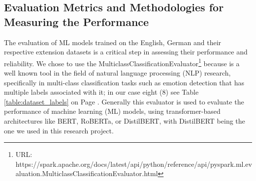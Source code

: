 \documentclass[11pt]{article}
\begin{document}
\subsection{Evaluation Metrics and Methodologies for Measuring the Performance}
\label{sec:evaluation-metrics-and-methodologies}
The evaluation of ML models trained on the English, German and their respective extension datasets is a critical step in assessing their performance and reliability. We chose to use the MulticlassClassificationEvaluator\footnote{URL: https://spark.apache.org/docs/latest/api/python/reference/api/pyspark.ml.evaluation.MulticlassClassificationEvaluator.html} because is a well known tool in the field of natural language processing (NLP) research, specifically in multi-class classification tasks such as emotion detection that has multiple labels associated with it; in our case eight (8) see Table \ref{table:dataset_labels} on Page \pageref{table:dataset_labels}. Generally this evaluator is used to evaluate the performance of machine learning (ML) models, using transformer-based architectures like BERT, RoBERTa, or DistilBERT\cite{Sanh2019-DistilBERT-AD}, with DistilBERT\cite{Sanh2019-DistilBERT-AD} being the one we used in this research project.
\end{document}
